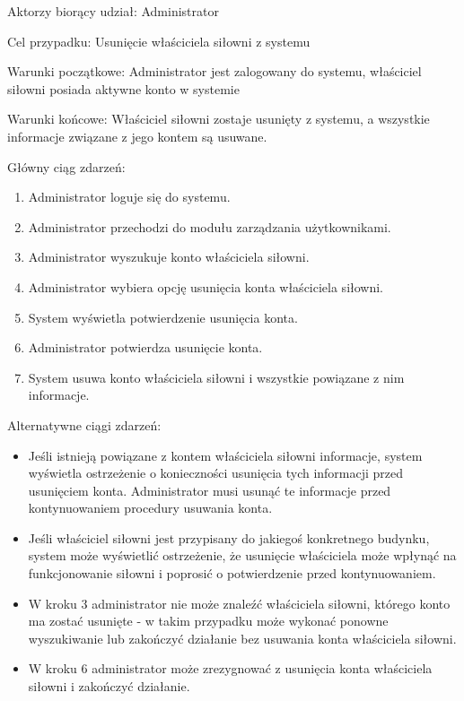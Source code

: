 \documentclass[
]{article}
\providecommand{\tightlist}{%
  \setlength{\itemsep}{0pt}\setlength{\parskip}{0pt}}
\begin{document}
{Aktorzy biorący udział: Administrator}

{Cel przypadku: Usunięcie właściciela siłowni z systemu}

{Warunki początkowe: Administrator jest zalogowany do systemu,
właściciel siłowni posiada aktywne konto w systemie}

{Warunki końcowe: Właściciel siłowni zostaje usunięty z systemu, a
wszystkie informacje związane z jego kontem są usuwane.}

{Główny ciąg zdarzeń:}

\begin{enumerate}
\tightlist
\item
  {Administrator loguje się do systemu.}
\item
  {Administrator przechodzi do modułu zarządzania użytkownikami.}
\item
  {Administrator wyszukuje konto właściciela siłowni.}
\item
  {Administrator wybiera opcję usunięcia konta właściciela siłowni.}
\item
  {System wyświetla potwierdzenie usunięcia konta.}
\item
  {Administrator potwierdza usunięcie konta.}
\item
  {System usuwa konto właściciela siłowni i wszystkie powiązane z nim
  informacje.}
\end{enumerate}

{Alternatywne ciągi zdarzeń:}

\begin{itemize}
\tightlist
\item
  {Jeśli istnieją powiązane z kontem właściciela siłowni informacje,
  system wyświetla ostrzeżenie o konieczności usunięcia tych informacji
  przed usunięciem konta. Administrator musi usunąć te informacje przed
  kontynuowaniem procedury usuwania konta.}
\item
  {Jeśli właściciel siłowni jest przypisany do jakiegoś konkretnego
  budynku, system może wyświetlić ostrzeżenie, że usunięcie właściciela
  może wpłynąć na funkcjonowanie siłowni i poprosić o potwierdzenie
  przed kontynuowaniem.}
\item
  {W kroku 3 administrator nie może znaleźć właściciela siłowni, którego
  konto ma zostać usunięte - w takim przypadku może wykonać ponowne
  wyszukiwanie lub zakończyć działanie bez usuwania konta właściciela
  siłowni.}
\item
  {W kroku 6 administrator może zrezygnować z usunięcia konta
  właściciela siłowni i zakończyć działanie.}
\end{itemize}
\end{document}
